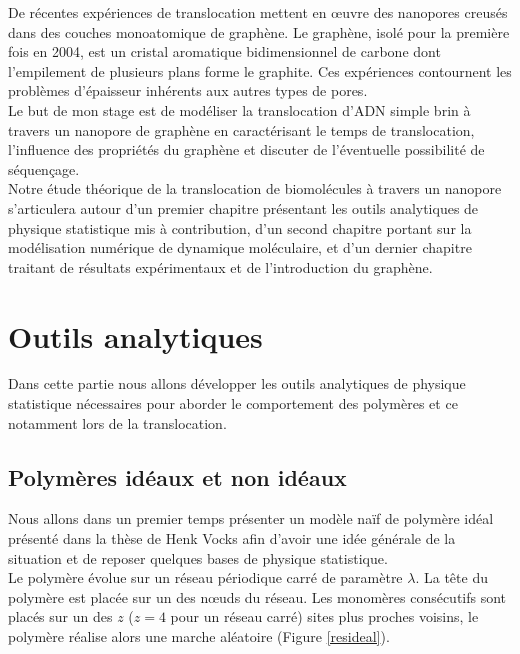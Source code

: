 \documentclass[a4paper,11pt]{article}
\begin{document}
De récentes expériences de translocation mettent en œuvre des nanopores creusés dans des couches monoatomique de graphène. Le graphène, isolé pour la première fois en 2004, est un cristal aromatique bidimensionnel de carbone dont l'empilement de plusieurs plans forme le graphite. Ces expériences contournent les problèmes d'épaisseur inhérents aux autres types de pores.\\

Le but de mon stage est de modéliser la translocation d'ADN simple brin à travers un nanopore de graphène en caractérisant le temps de translocation, l'influence des propriétés du graphène et discuter de l'éventuelle possibilité de séquençage.\\

Notre étude théorique de la translocation de biomolécules à travers un nanopore s'articulera autour d'un premier chapitre présentant les outils analytiques de physique statistique mis à contribution, d'un second chapitre portant sur la modélisation numérique de dynamique moléculaire, et d'un dernier chapitre traitant de résultats expérimentaux et de l'introduction du graphène.



\tableofcontents



\newpage 

\section{Outils analytiques}

Dans cette partie nous allons développer les outils analytiques de physique statistique nécessaires pour aborder le comportement des polymères et ce notamment lors de la translocation.

\subsection{Polymères idéaux et non idéaux}
Nous allons dans un premier temps présenter un modèle naïf de polymère idéal  présenté dans la thèse de Henk Vocks \cite{these} afin d'avoir une idée générale de la situation et de reposer quelques bases de physique statistique.\\

Le polymère évolue sur un réseau périodique carré de paramètre $\lambda$. La tête du polymère est placée sur un des nœuds du réseau. Les monomères consécutifs sont placés sur un des $z$ ($z=4$ pour un réseau carré) sites plus proches voisins, le polymère réalise alors une marche aléatoire (Figure \ref{resideal}).
\end{document}
